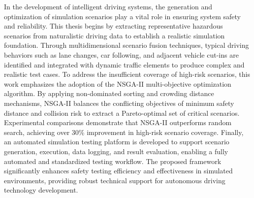 \begin{abstracten}

In the development of intelligent driving systems, the generation and optimization of simulation scenarios play a vital role in ensuring system safety and reliability. This thesis begins by extracting representative hazardous scenarios from naturalistic driving data to establish a realistic simulation foundation. Through multidimensional scenario fusion techniques, typical driving behaviors such as lane changes, car following, and adjacent vehicle cut-ins are identified and integrated with dynamic traffic elements to produce complex and realistic test cases. To address the insufficient coverage of high-risk scenarios, this work emphasizes the adoption of the NSGA-II multi-objective optimization algorithm. By applying non-dominated sorting and crowding distance mechanisms, NSGA-II balances the conflicting objectives of minimum safety distance and collision risk to extract a Pareto-optimal set of critical scenarios. Experimental comparisons demonstrate that NSGA-II outperforms random search, achieving over 30\% improvement in high-risk scenario coverage. Finally, an automated simulation testing platform is developed to support scenario generation, execution, data logging, and result evaluation, enabling a fully automated and standardized testing workflow. The proposed framework significantly enhances safety testing efficiency and effectiveness in simulated environments, providing robust technical support for autonomous driving technology development.

\end{abstracten}
